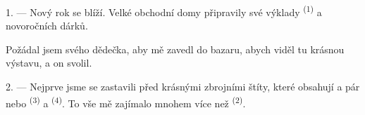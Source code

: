 %
%
%
%

\VUsaut{4.0mm}
\VUsaut{2.0mm}
\VUsaut{3.4mm}

1. --- Nový rok se blíží. Velké obchodní domy připravily své výklady 
\textsuperscript{(1)} a novoročních dárků.

Požádal jsem svého dědečka, aby mě zavedl do bazaru, abych viděl tu krásnou výstavu, a on
svolil.

2. --- Nejprve jsme se zastavili před krásnými zbrojními štíty, které obsahují
    a pár
 nebo   \textsuperscript{(3)} a
 \textsuperscript{(4)}. To vše mě zajímalo mnohem více než
 \textsuperscript{(2)}.

\VUsaut{3.0mm}
\VUsaut{2.6mm}

